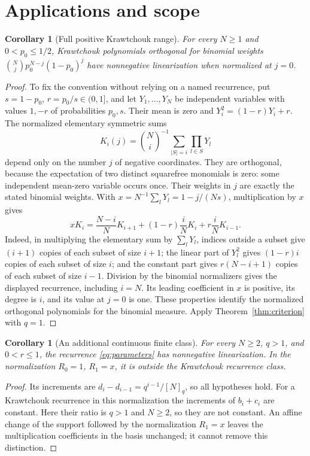\documentclass[11pt]{article}
\newtheorem{corollary}[theorem]{Corollary}
\begin{document}
\section{Applications and scope}
\begin{corollary}[Full positive Krawtchouk range]\label{cor:kraw}
For every $N\geq1$ and $0<p_0\leq1/2$, Krawtchouk polynomials orthogonal for binomial weights $\binom Nj p_0^{N-j}(1-p_0)^j$ have nonnegative linearization when normalized at $j=0$.
\end{corollary}
\begin{proof}
To fix the convention without relying on a named recurrence, put $s=1-p_0$, $r=p_0/s\in(0,1]$, and let $Y_1,\ldots,Y_N$ be independent variables with values $1,-r$ of probabilities $p_0,s$. Their mean is zero and $Y_i^2=(1-r)Y_i+r$. The normalized elementary symmetric sums
\[
K_i(j)=\binom Ni^{-1}\sum_{|S|=i}\prod_{l\in S}Y_l
\]
depend only on the number $j$ of negative coordinates. They are orthogonal, because the expectation of two distinct squarefree monomials is zero: some independent mean-zero variable occurs once. Their weights in $j$ are exactly the stated binomial weights. With $x=N^{-1}\sum_lY_l=1-j/(Ns)$, multiplication by $x$ gives
\[
xK_i=\frac{N-i}{N}K_{i+1}+(1-r)\frac iN K_i+r\frac iN K_{i-1}.
\]
Indeed, in multiplying the elementary sum by $\sum_lY_l$, indices outside a subset give $(i+1)$ copies of each subset of size $i+1$; the linear part of $Y_l^2$ gives $(1-r)i$ copies of each subset of size $i$; and the constant part gives $r(N-i+1)$ copies of each subset of size $i-1$. Division by the binomial normalizers gives the displayed recurrence, including $i=N$. Its leading coefficient in $x$ is positive, its degree is $i$, and its value at $j=0$ is one. These properties identify the normalized orthogonal polynomials for the binomial measure. Apply Theorem~\ref{thm:criterion} with $q=1$.
\end{proof}

\begin{corollary}[An additional continuous finite class]\label{cor:additional}
For every $N\geq2$, $q>1$, and $0<r\leq1$, the recurrence \eqref{eq:parameters} has nonnegative linearization. In the normalization $R_0=1$, $R_1=x$, it is outside the Krawtchouk recurrence class.
\end{corollary}
\begin{proof}
Its increments are $d_i-d_{i-1}=q^{i-1}/[N]_q$, so all hypotheses hold. For a Krawtchouk recurrence in this normalization the increments of $b_i+c_i$ are constant. Here their ratio is $q>1$ and $N\geq2$, so they are not constant. An affine change of the support followed by the normalization $R_1=x$ leaves the multiplication coefficients in the basis unchanged; it cannot remove this distinction.
\end{proof}
\end{document}
